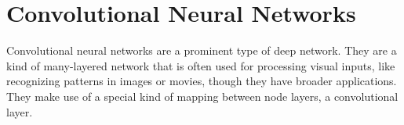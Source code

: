 \chapter{Convolutional Neural Networks}\label{ch_cnn}




Convolutional neural networks are a prominent type of deep network. They are a kind of many-layered network that is often used for processing visual inputs, like recognizing patterns in images or movies, though they have broader applications. They make use of a special kind of mapping between node layers, a convolutional layer. 

